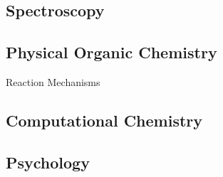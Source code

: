 

\subsection{\textbf{Spectroscopy}}
\vspace{-5mm}
\begin{multicols}{2} %
  \columnbreak
  
\end{multicols}

\vspace{-10mm}
\subsection{\textbf{Physical Organic Chemistry}}
\vspace{-2mm}
{Reaction Mechanisms
}

\subsection{\textbf{Computational Chemistry}}

\subsection{\textbf{Psychology}}
\vspace{-5mm}
\begin{multicols}{2} %
  \columnbreak
  
  \columnbreak
  
\end{multicols}

